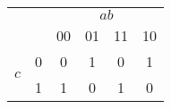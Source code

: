 \begin{tabular}{cc|cccc}
 & \multicolumn{1}{c}{} & \multicolumn{4}{c}{$ab$}\tabularnewline
 &  & 00 & 01 & 11 & 10\tabularnewline
\hline
\multirow{2}{*}{$c$} & 0 & 0 & 1 & 0 & 1\tabularnewline
 & 1 & 1 & 0 & 1 & 0\tabularnewline
\end{tabular}
